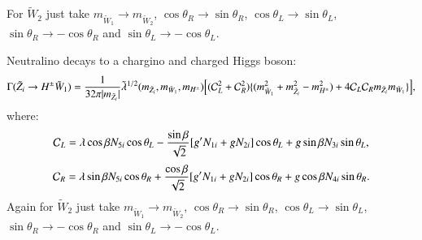\documentclass[final,3p,times]{elsarticle}
\begin{document}
For $\tilde{W}_2$ just take $m_{\tilde{W}_1} \rightarrow m_{\tilde{W}_2}$, $\cos\theta_R \rightarrow \sin\theta_R$,  $\cos\theta_L \rightarrow \sin\theta_L$, $\sin\theta_R \rightarrow -\cos\theta_R$ and $\sin\theta_L \rightarrow -\cos\theta_L$.

Neutralino decays to a chargino and charged Higgs boson:
\begin{equation} \label{neutHpmchNMSSM}
\Gamma(\tilde{Z}_i \rightarrow H^{\pm} \tilde{W}_{1}) = {1 \over 32\pi |m_{\tilde{Z}_i}|} \tilde{\lambda}^{1/2}(m_{\tilde{Z}_i},m_{\tilde{W}_1},m_{H^{\pm}})\Big[ (\mathcal{C}_{L}^2 + \mathcal{C}_{R}^2)\{(m_{\tilde{W}_1}^2 + m_{\tilde{Z}_i}^2 - m_{H^{\pm}}^2) + 4\mathcal{C}_{L} \mathcal{C}_{R} m_{\tilde{Z}_i} m_{\tilde{W}_1}\}\Big],
\end{equation}
where:
\begin{equation}
\mathcal{C}_{L} = \lambda\cos\beta N_{5i} \cos\theta_L  - {\sin\beta \over \sqrt{2}} [g' N_{1i} + gN_{2i}]\cos\theta_L + g\sin\beta N_{3i}\sin\theta_L,
\end{equation}
\begin{equation}
\mathcal{C}_{R} = \lambda\sin\beta N_{5i} \cos\theta_R  + {\cos\beta \over \sqrt{2}} [g' N_{1i} + gN_{2i}]\cos\theta_R + g\cos\beta N_{4i}\sin\theta_R.
\end{equation}
Again for $\tilde{W}_2$ just take $m_{\tilde{W}_1} \rightarrow m_{\tilde{W}_2}$, $\cos\theta_R \rightarrow \sin\theta_R$,  $\cos\theta_L \rightarrow \sin\theta_L$, $\sin\theta_R \rightarrow -\cos\theta_R$ and $\sin\theta_L \rightarrow -\cos\theta_L$.
\end{document}
